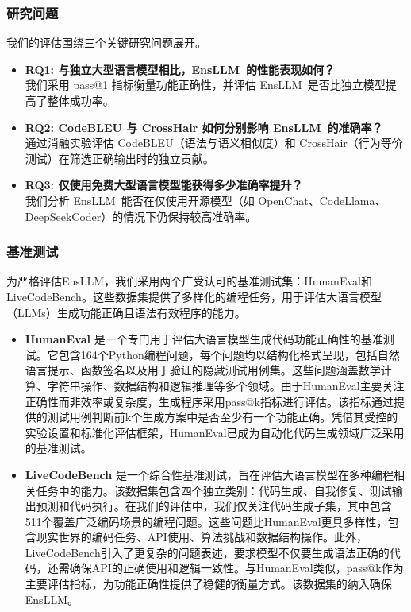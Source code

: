 \documentclass{article}
\newcommand{\tool}{EnsLLM}
\begin{document}
\begin{CJK*}{UTF8}{gbsn}
\subsubsection{研究问题}
我们的评估围绕三个关键研究问题展开。
\begin{itemize}
    \item
{\textbf{RQ1: 与独立大型语言模型相比，\tool\ 的性能表现如何？}}
    \\ 我们采用 pass@1 指标衡量功能正确性，并评估 \tool\ 是否比独立模型提高了整体成功率。
    \item
{\textbf{RQ2: CodeBLEU 与 CrossHair 如何分别影响 \tool\ 的准确率？}}
    \\ 通过消融实验评估 CodeBLEU（语法与语义相似度）和 CrossHair（行为等价测试）在筛选正确输出时的独立贡献。
    \item
{\textbf{RQ3: 仅使用免费大型语言模型能获得多少准确率提升？}}
    \\ 我们分析 \tool\ 能否在仅使用开源模型（如 OpenChat、CodeLlama、DeepSeekCoder）的情况下仍保持较高准确率。
\end{itemize}
\subsubsection{基准测试}
\leavevmode\par
为严格评估\tool，我们采用两个广受认可的基准测试集：HumanEval和LiveCodeBench。这些数据集提供了多样化的编程任务，用于评估大语言模型（LLMs）生成功能正确且语法有效程序的能力。

\begin{itemize}
    \item \textbf{HumanEval} \cite{humaneval} 是一个专门用于评估大语言模型生成代码功能正确性的基准测试。它包含164个Python编程问题，每个问题均以结构化格式呈现，包括自然语言提示、函数签名以及用于验证的隐藏测试用例集。这些问题涵盖数学计算、字符串操作、数据结构和逻辑推理等多个领域。由于HumanEval主要关注正确性而非效率或复杂度，生成程序采用pass@k指标进行评估。该指标通过提供的测试用例判断前k个生成方案中是否至少有一个功能正确。凭借其受控的实验设置和标准化评估框架，HumanEval已成为自动化代码生成领域广泛采用的基准测试。

    \item \textbf{LiveCodeBench} \cite{livecodebench} 是一个综合性基准测试，旨在评估大语言模型在多种编程相关任务中的能力。该数据集包含四个独立类别：代码生成、自我修复、测试输出预测和代码执行。在我们的评估中，我们仅关注代码生成子集，其中包含511个覆盖广泛编码场景的编程问题。这些问题比HumanEval更具多样性，包含现实世界的编码任务、API使用、算法挑战和数据结构操作。此外，LiveCodeBench引入了更复杂的问题表述，要求模型不仅要生成语法正确的代码，还需确保API的正确使用和逻辑一致性。与HumanEval类似，pass@k作为主要评估指标，为功能正确性提供了稳健的衡量方式。该数据集的纳入确保\tool{}。
\end{itemize}

\end{CJK*}
\end{document}
